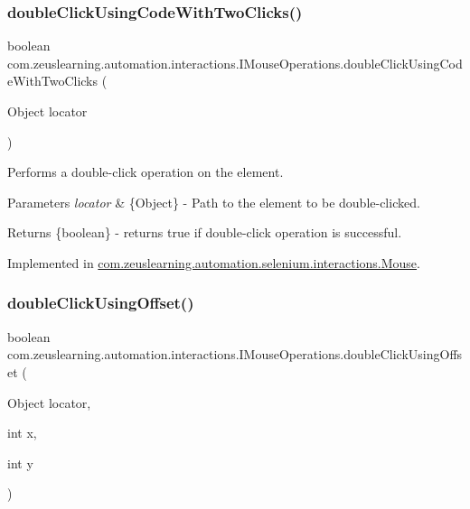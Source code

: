 \subsubsection{\texorpdfstring{double\+Click\+Using\+Code\+With\+Two\+Clicks()}{doubleClickUsingCodeWithTwoClicks()}}
{\footnotesize\ttfamily boolean com.\+zeuslearning.\+automation.\+interactions.\+I\+Mouse\+Operations.\+double\+Click\+Using\+Code\+With\+Two\+Clicks (\begin{DoxyParamCaption}\item[{Object}]{locator }\end{DoxyParamCaption})}

Performs a double-\/click operation on the element.


\begin{DoxyParams}{Parameters}
{\em locator} & \{Object\} -\/ Path to the element to be double-\/clicked. \\
\hline
\end{DoxyParams}
\begin{DoxyReturn}{Returns}
\{boolean\} -\/ returns {\ttfamily true} if double-\/click operation is successful. 
\end{DoxyReturn}


Implemented in \hyperlink{classcom_1_1zeuslearning_1_1automation_1_1selenium_1_1interactions_1_1Mouse_a083f651ca67fec159c6992f44019164b}{com.\+zeuslearning.\+automation.\+selenium.\+interactions.\+Mouse}.

\hypertarget{interfacecom_1_1zeuslearning_1_1automation_1_1interactions_1_1IMouseOperations_a1f5da55df87112de1018b7c2e2ea3207}{}\label{interfacecom_1_1zeuslearning_1_1automation_1_1interactions_1_1IMouseOperations_a1f5da55df87112de1018b7c2e2ea3207} 
\subsubsection{\texorpdfstring{double\+Click\+Using\+Offset()}{doubleClickUsingOffset()}}
{\footnotesize\ttfamily boolean com.\+zeuslearning.\+automation.\+interactions.\+I\+Mouse\+Operations.\+double\+Click\+Using\+Offset (\begin{DoxyParamCaption}\item[{Object}]{locator,  }\item[{int}]{x,  }\item[{int}]{y }\end{DoxyParamCaption})}

